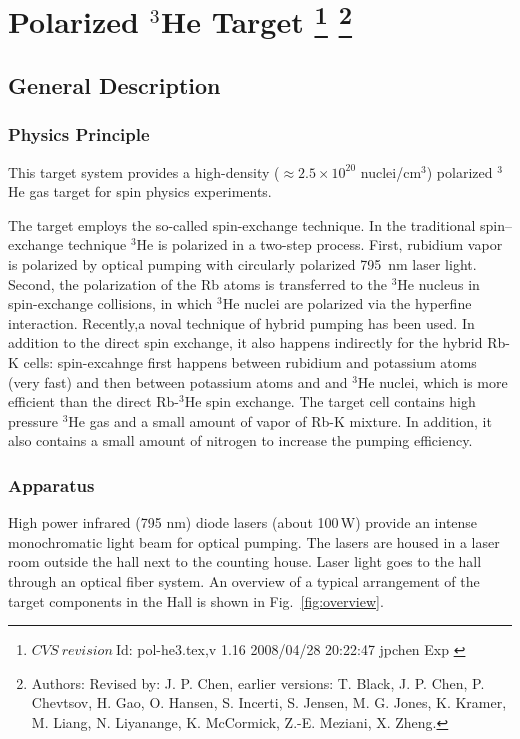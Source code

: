 \chapter[Polarized $^3$He Target]{Polarized $^3$He Target
\footnote{
  $CVS~revision~ $Id: pol-he3.tex,v 1.16 2008/04/28 20:22:47 jpchen Exp $ $
}
\footnote{Authors: Revised by: J. P. Chen, earlier versions: 
T. Black, J. P. Chen, P. Chevtsov, H. Gao, 
O. Hansen, S. Incerti, S. Jensen, M. G. Jones, K. Kramer, M. Liang, 
N. Liyanange, K. McCormick, Z.-E. Meziani, X. Zheng.
}
}

\section{General Description}
\label{sec:target-he3-general}
\subsection{Physics Principle}

This target system provides a high-density 
($\approx 2.5\times 10^{20}$ nuclei/cm$^3$)
polarized $^3$He gas target for spin physics experiments. 

The target employs the so-called spin-exchange technique.
In the traditional spin--exchange technique $^3$He is polarized in 
a two-step process.
First, rubidium vapor is polarized by optical pumping with
circularly polarized 795~nm laser light. Second, the polarization
of the Rb atoms is transferred to the $^3$He nucleus in spin-exchange
collisions, in which $^3$He nuclei are polarized via the hyperfine interaction.
Recently,a noval technique of hybrid pumping has been used.  
In addition to the direct spin exchange, it also happens indirectly for the 
hybrid Rb-K cells: spin-excahnge first happens between rubidium and potassium atoms 
(very fast) and 
then between potassium atoms and and $^3$He nuclei, which is more efficient 
than the direct Rb-$^3$He spin exchange.
The target cell contains high pressure $^3$He gas and a small amount of
vapor of Rb-K mixture. 
In addition, it
also contains a small amount of nitrogen to increase the
pumping efficiency.

\subsection{Apparatus}

High power infrared (795 nm) diode lasers (about 100\,W) provide an intense 
monochromatic
light beam for optical pumping. 
The lasers are housed in a laser room
outside the hall next to the counting house. Laser light goes to the hall 
through an optical fiber system.  An overview of a
typical arrangement of the target components in the Hall is shown in
Fig.~\ref{fig:overview}.


